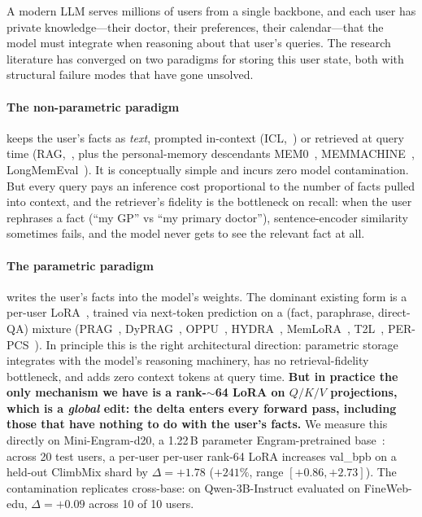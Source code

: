 \documentclass{article}
\begin{document}
A modern LLM serves millions of users from a single backbone, and each
user has private knowledge—their doctor, their preferences, their
calendar—that the model must integrate when reasoning about that user's
queries. The research literature has converged on two paradigms for
storing this user state, both with structural failure modes that have
gone unsolved.

\paragraph{The non-parametric paradigm} keeps the user's facts as
\emph{text}, prompted in-context (ICL,~\citealt{brown2020gpt3}) or
retrieved at query time (RAG,~\citealt{lewis2020rag}, plus the
personal-memory descendants
MEM0~\citep{mem02024}, MEMMACHINE~\citep{memmachine2024},
LongMemEval~\citep{wu2024longmemeval}). It is conceptually simple and
incurs zero model contamination. But every query pays an inference
cost proportional to the number of facts pulled into context, and the
retriever's fidelity is the bottleneck on recall: when the user
rephrases a fact (``my GP'' vs ``my primary doctor''), sentence-encoder
similarity sometimes fails, and the model never gets to see the
relevant fact at all.

\paragraph{The parametric paradigm} writes the user's facts into the
model's weights. The dominant existing form is a per-user
LoRA~\citep{hu2022lora,houlsby2019adapters}, trained via next-token
prediction on a (fact, paraphrase, direct-QA) mixture
(PRAG~\citep{su2024prag}, DyPRAG~\citep{tan2025dyprag},
OPPU~\citep{tan2024oppu}, HYDRA~\citep{zhuang2024hydra},
MemLoRA~\citep{memlora2025}, T2L~\citep{t2l2024},
PER-PCS~\citep{tan2024perpcs}). In principle this is the right
architectural direction: parametric storage integrates with the
model's reasoning machinery, has no retrieval-fidelity bottleneck,
and adds zero context tokens at query time. \textbf{But in practice
the only mechanism we have is a rank-$\sim$64 LoRA on $Q/K/V$
projections, which is a \emph{global} edit: the delta enters every
forward pass, including those that have nothing to do with the user's
facts.} We measure this directly on Mini-Engram-d20, a 1.22\,B
parameter Engram-pretrained base~\citep{cheng2026engram}: across 20
test users, a per-user per-user rank-64 LoRA increases val\_bpb on
a held-out ClimbMix shard by $\Delta = +1.78$ ($+241\%$, range
$[+0.86, +2.73]$). The contamination replicates cross-base: on
Qwen-3B-Instruct evaluated on FineWeb-edu, $\Delta = +0.09$ across
10 of 10 users.
\end{document}
